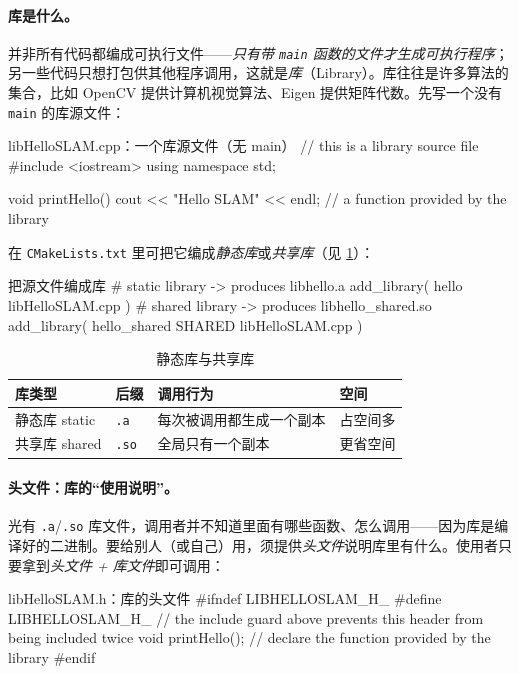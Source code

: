 \paragraph{库是什么。}
并非所有代码都编成可执行文件——\emph{只有带 \texttt{main} 函数的文件才生成可执行程序}；另一些代码只想打包供其他程序调用，这就是\emph{库}（Library）。库往往是许多算法的集合，比如 OpenCV 提供计算机视觉算法、Eigen 提供矩阵代数。先写一个没有 \texttt{main} 的库源文件：

\begin{codebox}[C++]{libHelloSLAM.cpp：一个库源文件（无 main）}
// this is a library source file
#include <iostream>
using namespace std;

void printHello() {
    cout << "Hello SLAM" << endl;   // a function provided by the library
}
\end{codebox}

\noindent 在 \texttt{CMakeLists.txt} 里可把它编成\emph{静态库}或\emph{共享库}（见 \cref{tab:intro-libtype}）：

\begin{codebox}[text]{把源文件编成库}
# static library -> produces libhello.a
add_library( hello libHelloSLAM.cpp )
# shared library -> produces libhello_shared.so
add_library( hello_shared SHARED libHelloSLAM.cpp )
\end{codebox}

\begin{table}[H]\centering\small
\caption{静态库与共享库}
\label{tab:intro-libtype}
\begin{tabular}{p{} p{} p{} p{}}
\toprule
库类型 & 后缀 & 调用行为 & 空间 \\
\midrule
静态库 static & \texttt{.a} & 每次被调用都生成一个副本 & 占空间多 \\
共享库 shared & \texttt{.so} & 全局只有一个副本 & 更省空间 \\
\bottomrule
\end{tabular}
\end{table}

\paragraph{头文件：库的“使用说明”。}
光有 \texttt{.a}/\texttt{.so} 库文件，调用者并不知道里面有哪些函数、怎么调用——因为库是编译好的二进制。要给别人（或自己）用，须提供\emph{头文件}说明库里有什么。使用者只要拿到\emph{头文件 + 库文件}即可调用：

\begin{codebox}[C++]{libHelloSLAM.h：库的头文件}
#ifndef LIBHELLOSLAM_H_
#define LIBHELLOSLAM_H_
// the include guard above prevents this header from being included twice
void printHello();   // declare the function provided by the library
#endif
\end{codebox}

